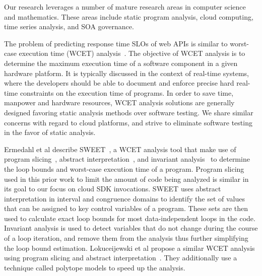 Our research leverages a number of mature research areas in computer 
science and mathematics. These areas include static program analysis, 
cloud computing, time series analysis,
and SOA governance.

The problem of predicting response time SLOs of web APIs 
is similar to worst-case execution
time (WCET) analysis~\cite{Wilhelm:2008:WEP:1347375.1347389,ermedahl2007loop,Sandberg:2006:FWF:1134650.1134666,Muchnick:1998:ACD:286076,Frost:2011:WAJ:2043910.2043916}. 
The objective of WCET analysis is to determine the maximum execution time of a software component in a given hardware platform. It is 
typically discussed in the context of real-time systems, where the developers should be able to document
and enforce precise hard real-time constraints on the execution time of programs. In order to save time, 
manpower and hardware resources, WCET analysis solutions are generally designed favoring static
analysis methods over software testing. We share similar concerns with regard to cloud platforms,
and strive to eliminate software testing in the favor of static analysis. 

Ermedahl et al describe SWEET~\cite{ermedahl2007loop}, a WCET analysis tool that make use of program slicing~\cite{Sandberg:2006:FWF:1134650.1134666},
 abstract interpretation~\cite{Cousot:1977:AIU:512950.512973}, and invariant analysis~\cite{Muchnick:1998:ACD:286076} to determine the loop bounds and worst-case execution time 
 of a program. 
Program slicing used in this prior work to limit the amount of code being analyzed is similar in its goal to our focus on cloud SDK invocations.
SWEET uses abstract interpretation in interval and congruence domains to identify
the set of values that can be assigned to key control variables of a program. These sets are then
used to calculate exact loop bounds for most data-independent loops in the code. Invariant analysis  is
used to detect variables that do not change during the course of a loop iteration, and remove them from
the analysis thus further simplifying the loop bound estimation. 
Lokuceijewski et al propose 
 a similar WCET analysis using program slicing and abstract interpretation~\cite{Lokuciejewski:2009:FPS:1545006.1545064}. They additionally use a technique
called polytope models to speed up the analysis.  
 
